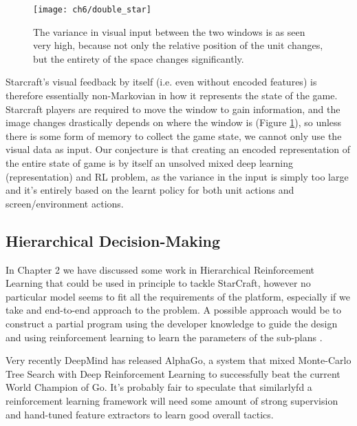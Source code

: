 \begin{figure}[h]
    \centering
    \texttt{[image: ch6/double\_star]}
    \caption{The variance in visual input between the two windows is as seen
      very high, because not only the relative position of the unit changes, but
      the entirety of the space changes significantly.}
    \label{fig:double_star}
\end{figure}

Starcraft’s visual feedback by itself (i.e. even without encoded features) is
therefore essentially non-Markovian in how it represents the state of the game.
Starcraft players are required to move the window to gain information, and the
image changes drastically depends on where the window is (Figure
\ref{fig:double_star}), so unless there is some form of memory to collect the
game state, we cannot only use the visual data as input. Our conjecture is that
creating an encoded representation of the entire state of game is by itself an
unsolved mixed deep learning (representation) and RL problem, as the variance in
the input is simply too large and it's entirely based on the learnt policy for
both unit actions and screen/environment actions.

\subsection{Hierarchical Decision-Making}

In Chapter 2 we have discussed some work in Hierarchical Reinforcement Learning
that could be used in principle to tackle StarCraft, however no particular model
seems to fit all the requirements of the platform, especially if we take and
end-to-end approach to the problem. A possible approach would be to construct a
partial program using the developer knowledge to guide the design and using
reinforcement learning to learn the parameters of the sub-plans
\citep{marthi2005concurrent}.

Very recently DeepMind has released AlphaGo, a system that mixed Monte-Carlo
Tree Search with Deep Reinforcement Learning \citep{silver2016mastering} to
successfully beat the current World Champion of Go. It's probably fair to
speculate that similarlyfd a reinforcement learning framework will need some
amount of strong supervision and hand-tuned feature extractors to learn good
overall tactics.


